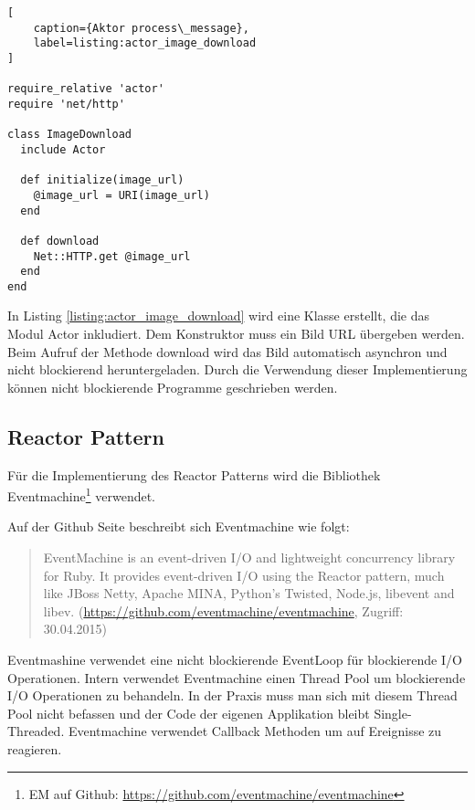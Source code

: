 \begin{lstlisting}[
	caption={Aktor process\_message},
	label=listing:actor_image_download
]

require_relative 'actor'
require 'net/http'

class ImageDownload
  include Actor

  def initialize(image_url)
    @image_url = URI(image_url)
  end

  def download
    Net::HTTP.get @image_url
  end
end
\end{lstlisting}

In Listing \ref{listing:actor_image_download} wird eine Klasse erstellt, die das Modul Actor inkludiert. Dem Konstruktor muss ein Bild URL übergeben werden. Beim Aufruf der Methode download wird das Bild automatisch asynchron und nicht blockierend heruntergeladen. Durch die Verwendung dieser Implementierung können nicht blockierende Programme geschrieben werden. 

\subsection{Reactor Pattern}
Für die Implementierung des Reactor Patterns wird die Bibliothek Eventmachine\footnote{EM auf Github: \url{https://github.com/eventmachine/eventmachine}} verwendet. 

Auf der Github Seite beschreibt sich Eventmachine wie folgt: 

\begin{quote}
	EventMachine is an event-driven I/O and lightweight concurrency library for Ruby. It provides event-driven I/O using the Reactor pattern, much like JBoss Netty, Apache MINA, Python's Twisted, Node.js, libevent and libev. (\url{https://github.com/eventmachine/eventmachine}, Zugriff: 30.04.2015)
\end{quote}

Eventmashine verwendet eine nicht blockierende EventLoop für blockierende I/O Operationen. Intern verwendet Eventmachine einen Thread Pool um blockierende I/O Operationen zu behandeln. In der Praxis muss man sich mit diesem Thread Pool nicht befassen und der Code der eigenen Applikation bleibt Single-Threaded. Eventmachine verwendet Callback Methoden um auf Ereignisse zu reagieren. 

